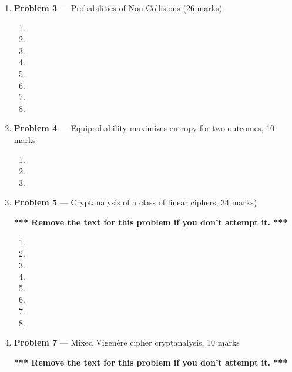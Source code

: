 \documentclass[11pt]{article}
\theoremstyle{definition}
\begin{document}
\begin{enumerate}
\item[] \textbf{Problem 3} --- Probabilities of Non-Collisions (26 marks)

\begin{enumerate}
\item
\item
\item
\item
\item
\item
\item
\item
\end{enumerate}

\newpage

\item[] \textbf{Problem 4} --- Equiprobability maximizes entropy for two outcomes, 10 marks
\begin{enumerate}
\item

\item
\item
\end{enumerate}

\newpage

\item[] \textbf{Problem 5} --- Cryptanalysis of a class of linear ciphers, 34 marks)

\textbf{*** Remove the text for this problem if you don't attempt it. ***}

\begin{enumerate}
\item
\item
\item
\item
\item
\item
\item
\item
\end{enumerate}

\newpage

\item[] \textbf{Problem 7} --- Mixed Vigen\`ere cipher cryptanalysis, 10 marks

\textbf{*** Remove the text for this problem if you don't attempt it. ***}


\end{enumerate}
\end{document}

